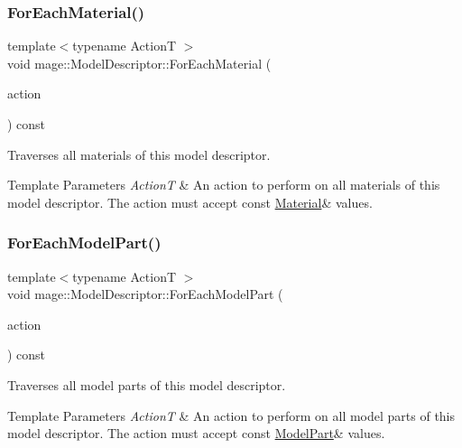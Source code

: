 \subsubsection{\texorpdfstring{For\+Each\+Material()}{ForEachMaterial()}}
{\footnotesize\ttfamily template$<$typename ActionT $>$ \\
void mage\+::\+Model\+Descriptor\+::\+For\+Each\+Material (\begin{DoxyParamCaption}\item[{ActionT}]{action }\end{DoxyParamCaption}) const}

Traverses all materials of this model descriptor.


\begin{DoxyTemplParams}{Template Parameters}
{\em ActionT} & An action to perform on all materials of this model descriptor. The action must accept {\ttfamily const} {\ttfamily \hyperlink{classmage_1_1_material}{Material}\&} values. \\
\hline
\end{DoxyTemplParams}
\hypertarget{classmage_1_1_model_descriptor_a1d61699788385cf29726fac0067bcb5c}{}\label{classmage_1_1_model_descriptor_a1d61699788385cf29726fac0067bcb5c} 
\subsubsection{\texorpdfstring{For\+Each\+Model\+Part()}{ForEachModelPart()}}
{\footnotesize\ttfamily template$<$typename ActionT $>$ \\
void mage\+::\+Model\+Descriptor\+::\+For\+Each\+Model\+Part (\begin{DoxyParamCaption}\item[{ActionT}]{action }\end{DoxyParamCaption}) const}

Traverses all model parts of this model descriptor.


\begin{DoxyTemplParams}{Template Parameters}
{\em ActionT} & An action to perform on all model parts of this model descriptor. The action must accept {\ttfamily const} {\ttfamily \hyperlink{structmage_1_1_model_part}{Model\+Part}\&} values. \\
\hline
\end{DoxyTemplParams}
\hypertarget{classmage_1_1_model_descriptor_adc013e6b054c7efa0d92a3ad1ff37e61}{}\label{classmage_1_1_model_descriptor_adc013e6b054c7efa0d92a3ad1ff37e61} 
